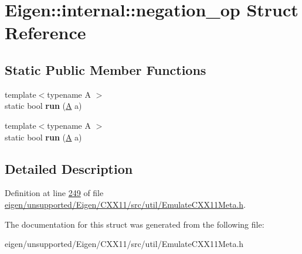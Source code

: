 \hypertarget{struct_eigen_1_1internal_1_1negation__op}{}\section{Eigen\+:\+:internal\+:\+:negation\+\_\+op Struct Reference}
\label{struct_eigen_1_1internal_1_1negation__op}
\subsection*{Static Public Member Functions}
\begin{DoxyCompactItemize}
\item 
\mbox{\label{struct_eigen_1_1internal_1_1negation__op_a19db9215de0c7a626a782124eae06c56}} 
{\footnotesize template$<$typename A $>$ }\\static bool {\bfseries run} (\hyperlink{group___core___module_class_eigen_1_1_matrix}{A} a)
\item 
\mbox{\label{struct_eigen_1_1internal_1_1negation__op_a19db9215de0c7a626a782124eae06c56}} 
{\footnotesize template$<$typename A $>$ }\\static bool {\bfseries run} (\hyperlink{group___core___module_class_eigen_1_1_matrix}{A} a)
\end{DoxyCompactItemize}


\subsection{Detailed Description}


Definition at line \hyperlink{eigen_2unsupported_2_eigen_2_c_x_x11_2src_2util_2_emulate_c_x_x11_meta_8h_source_l00249}{249} of file \hyperlink{eigen_2unsupported_2_eigen_2_c_x_x11_2src_2util_2_emulate_c_x_x11_meta_8h_source}{eigen/unsupported/\+Eigen/\+C\+X\+X11/src/util/\+Emulate\+C\+X\+X11\+Meta.\+h}.



The documentation for this struct was generated from the following file\+:\begin{DoxyCompactItemize}
\item 
eigen/unsupported/\+Eigen/\+C\+X\+X11/src/util/\+Emulate\+C\+X\+X11\+Meta.\+h\end{DoxyCompactItemize}
